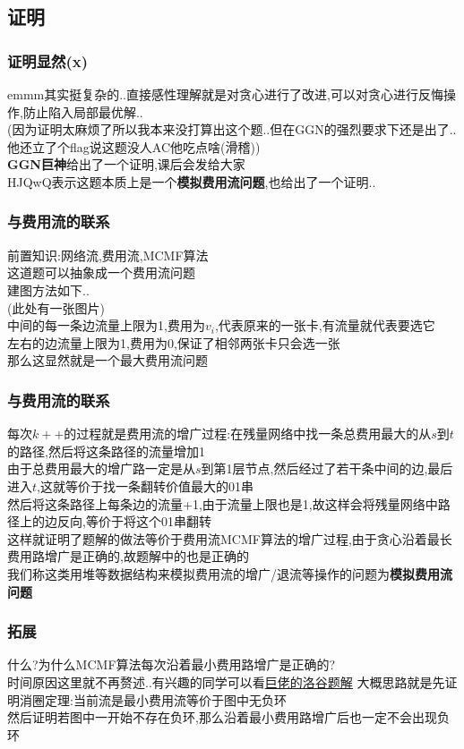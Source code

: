 \documentclass{beamer}
\begin{document}
		\subsection{证明}
			\begin{frame}\frametitle{证明显然(x)}
				emmm其实挺复杂的..直接感性理解就是对贪心进行了改进,可以对贪心进行反悔操作,防止陷入局部最优解..\\
				(因为证明太麻烦了所以我本来没打算出这个题..但在GGN的强烈要求下还是出了..他还立了个flag说这题没人AC他吃点啥(滑稽))\\
				\textbf{GGN巨神}给出了一个证明,课后会发给大家\\
				HJQwQ表示这题本质上是一个\textbf{模拟费用流问题},也给出了一个证明..
			\end{frame}
			\begin{frame}\frametitle{与费用流的联系}
				前置知识:网络流,费用流,MCMF算法\\
				这道题可以抽象成一个费用流问题\\
				建图方法如下..\\
				(此处有一张图片)\\
				中间的每一条边流量上限为1,费用为$v_i$,代表原来的一张卡,有流量就代表要选它\\
				左右的边流量上限为1,费用为0,保证了相邻两张卡只会选一张\\
				那么这显然就是一个最大费用流问题\\
			\end{frame}
			\begin{frame}\frametitle{与费用流的联系}
				每次$k++$的过程就是费用流的增广过程:在残量网络中找一条总费用最大的从$s$到$t$的路径,然后将这条路径的流量增加1\\
				由于总费用最大的增广路一定是从$s$到第1层节点,然后经过了若干条中间的边,最后进入$t$,这就等价于找一条翻转价值最大的01串\\
				然后将这条路径上每条边的流量+1,由于流量上限也是1,故这样会将残量网络中路径上的边反向,等价于将这个01串翻转\\
				这样就证明了题解的做法等价于费用流MCMF算法的增广过程,由于贪心沿着最长费用路增广是正确的,故题解中的也是正确的\\
				我们称这类用堆等数据结构来模拟费用流的增广/退流等操作的问题为\textbf{模拟费用流问题}\\
			\end{frame}
			\begin{frame}\frametitle{拓展}
				什么?为什么MCMF算法每次沿着最小费用路增广是正确的?\\
				时间原因这里就不再赘述..有兴趣的同学可以看\underline{\href{https://www.luogu.com.cn/blog/Bartholomew/solution-p3381}{巨佬的洛谷题解}}
				大概思路就是先证明消圈定理:当前流是最小费用流等价于图中无负环\\
				然后证明若图中一开始不存在负环,那么沿着最小费用路增广后也一定不会出现负环
			\end{frame}
\end{document}
